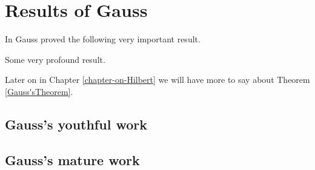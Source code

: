 
\chapter{Results of Gauss}


\label{chapter-on-Gauss}

In \cite{Neumann2005} Gauss proved the following very important result.
\begin{thm}
\cite[Theorem A]{Hilbert1893} \label{Gauss'sTheorem} Some very profound
result. 
\end{thm}
Later on in Chapter \ref{chapter-on-Hilbert} we will have more to
say about Theorem \ref{Gauss'sTheorem}.


\section{Gauss's youthful work}

\lipsum[1-30]


\section{Gauss's mature work}

\lipsum[31-60]


